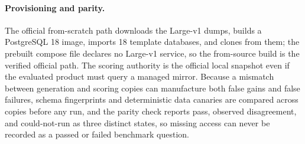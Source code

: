 \paragraph{Provisioning and parity.}
The official from-scratch path downloads the Large-v1 dumps, builds a PostgreSQL
18 image, imports 18 template databases, and clones from them; the prebuilt
compose file declares no Large-v1 service, so the from-source build is the
verified official path. The scoring authority is the official local snapshot even
if the evaluated product must query a managed mirror. Because a mismatch between
generation and scoring copies can manufacture both false gains and false
failures, schema fingerprints and deterministic data canaries are compared across
copies before any run, and the parity check reports pass, observed disagreement,
and could-not-run as three distinct states, so missing access can never be
recorded as a passed or failed benchmark question.
